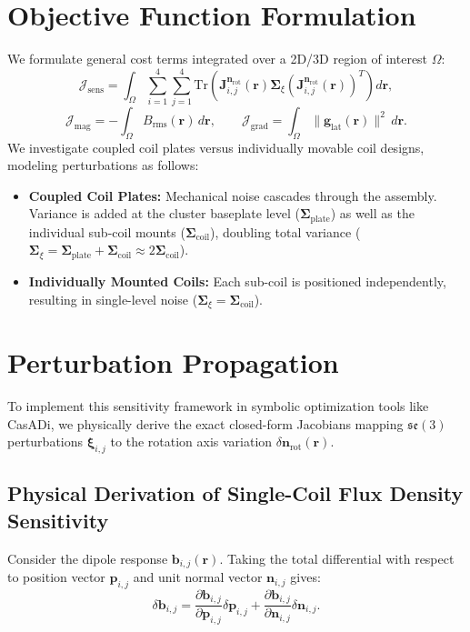 \documentclass[11pt, a4paper]{article}
\begin{document}
\section{Objective Function Formulation}
We formulate general cost terms integrated over a 2D/3D region of interest $\Omega$:
\begin{equation}
    \mathcal{J}_{\text{sens}} = \int_{\Omega} \sum_{i=1}^4 \sum_{j=1}^4 \text{Tr}\left( \mathbf{J}_{i,j}^{\mathbf{n}_{\text{rot}}}(\mathbf{r}) \boldsymbol{\Sigma}_{\xi} \left(\mathbf{J}_{i,j}^{\mathbf{n}_{\text{rot}}}(\mathbf{r})\right)^T \right) d\mathbf{r},
\end{equation}
\begin{equation}
    \mathcal{J}_{\text{mag}} = -\int_{\Omega} B_{\text{rms}}(\mathbf{r}) \, d\mathbf{r}, \qquad \mathcal{J}_{\text{grad}} = \int_{\Omega} \|\mathbf{g}_{\text{lat}}(\mathbf{r})\|^2 \, d\mathbf{r}.
\end{equation}
We investigate coupled coil plates versus individually movable coil designs, modeling perturbations as follows:
\begin{itemize}
    \item \textbf{Coupled Coil Plates:} Mechanical noise cascades through the assembly. Variance is added at the cluster baseplate level ($\boldsymbol{\Sigma}_{\text{plate}}$) as well as the individual sub-coil mounts ($\boldsymbol{\Sigma}_{\text{coil}}$), doubling total variance ($\boldsymbol{\Sigma}_{\xi} = \boldsymbol{\Sigma}_{\text{plate}} + \boldsymbol{\Sigma}_{\text{coil}} \approx 2\boldsymbol{\Sigma}_{\text{coil}}$).
    \item \textbf{Individually Mounted Coils:} Each sub-coil is positioned independently, resulting in single-level noise ($\boldsymbol{\Sigma}_{\xi} = \boldsymbol{\Sigma}_{\text{coil}}$).
\end{itemize}

\section{Perturbation Propagation}

To implement this sensitivity framework in symbolic optimization tools like CasADi, we physically derive the exact closed-form Jacobians mapping $\mathfrak{se}(3)$ perturbations $\boldsymbol{\xi}_{i,j}$ to the rotation axis variation $\delta \mathbf{n}_{\text{rot}}(\mathbf{r})$.

\subsection{Physical Derivation of Single-Coil Flux Density Sensitivity}
Consider the dipole response $\mathbf{b}_{i,j}(\mathbf{r})$. Taking the total differential with respect to position vector $\mathbf{p}_{i,j}$ and unit normal vector $\mathbf{n}_{i,j}$ gives:
\begin{equation}
    \delta \mathbf{b}_{i,j} = \frac{\partial \mathbf{b}_{i,j}}{\partial \mathbf{p}_{i,j}} \delta \mathbf{p}_{i,j} + \frac{\partial \mathbf{b}_{i,j}}{\partial \mathbf{n}_{i,j}} \delta \mathbf{n}_{i,j}.
\end{equation}
\end{document}
